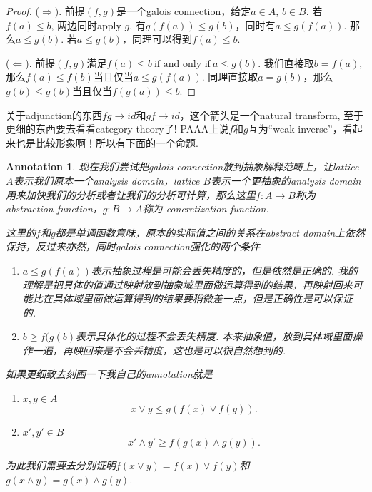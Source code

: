 \documentclass{article}
\newtheorem{annotation}[theorem]{Annotation}
\newcommand*{\xfunc}[4]{{#2}\colon{#3}{#1}{#4}}
\newcommand*{\func}[3]{\xfunc{\to}{#1}{#2}{#3}}
\begin{document}
\begin{center}
\end{center}

\begin{proof}
($\Rightarrow$). 前提$(f,g)$是一个galois connection，给定$a \in A$, $b \in B$. 若$f(a) \leq b$, 两边同时apply $g$, 有$g(f(a)) \leq g(b)$，同时有$a \leq g(f(a))$. 那么$a \leq g(b)$. 若$a \leq g(b)$，同理可以得到$f(a) \leq b$.

($\Leftarrow$). 前提$(f,g)$满足$f(a) \leq b~\text{if and only if}~a \leq g(b)$. 我们直接取$b = f(a)$, 那么$f(a) \leq f(b)$当且仅当$a \leq g(f(a))$. 同理直接取$a = g(b)$，那么$g(b) \leq g(b)$当且仅当$f(g(a)) \leq b $.   
\end{proof}

{\color{blue} 关于adjunction的东西$fg \rightarrow id$和$gf \rightarrow id$，这个箭头是一个natural transform, 至于更细的东西要去看看category theory了! PAAA上说$f$和$g$互为“weak inverse”，看起来也是比较形象啊！所以有下面的一个命题}.

\begin{annotation}
\rm 现在我们尝试把galois connection放到抽象解释范畴上，让lattice $A$表示我们原本一个analysis domain，lattice $B$表示一个更抽象的analysis domain用来加快我们的分析或者让我们的分析可计算，那么这里$\func{f}{A}{B}$称为{\color{red} abstraction function}，$\func{g}{B}{A}$称为{\color{red} concretization function}. 

这里的$f$和$g$都是单调函数意味，原本的实际值之间的关系在abstract domain上依然保持，反过来亦然，同时galois connection强化的两个条件
\begin{enumerate}
	\item $a \leq g(f(a))$表示抽象过程是可能会丢失精度的，但是依然是正确的. {\color{blue} 我的理解是把具体的值通过映射放到抽象域里面做运算得到的结果，再映射回来可能比在具体域里面做运算得到的结果要稍微差一点，但是正确性是可以保证的}.
	\item $b \geq f(g(b)$表示具体化的过程不会丢失精度. {\color{blue} 本来抽象值，放到具体域里面操作一遍，再映回来是不会丢精度，这也是可以很自然想到的}.
\end{enumerate}
如果更细致去刻画一下我自己的annotation就是
\begin{enumerate}
	\item $x,y \in A$
	$$
	x \vee y \leq g(f(x) \vee f(y)).
	$$
	\item $x',y'\in B$
	$$
	x' \wedge y' \geq f(g(x) \wedge g(y)).
	$$
\end{enumerate}
为此我们需要去分别证明$f(x \vee y) = f(x) \vee f(y)$和$g(x \wedge y) = g(x) \wedge g(y)$.
\end{annotation}
\end{document}
